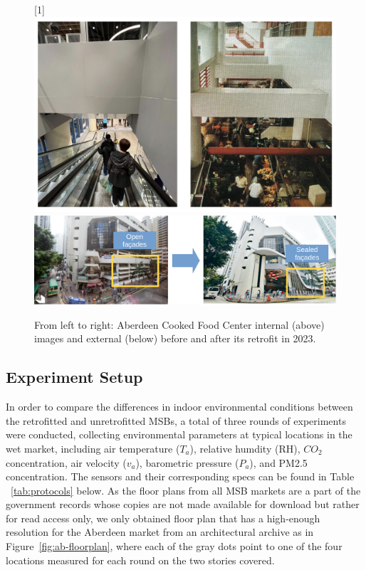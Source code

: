 \documentclass[preprint,12pt]{elsarticle}
\begin{document}
\begin{figure}[h!]
    \centering
    \scalebox{-1}[1]{\includegraphics[width=0.65\linewidth]{img/Aberdeenb4aft.png}}
    \includegraphics[width=0.7\linewidth]{img/open_to_close_facade.png}
    \caption{From left to right: Aberdeen Cooked Food Center internal (above) images and external (below) before and after its retrofit in 2023.}
    \label{fig:transition-ab}
\end{figure}

\subsection{Experiment Setup}%

    In order to compare the differences in indoor environmental conditions between the retrofitted and unretrofitted MSBs, a total of three rounds of experiments were conducted, collecting environmental parameters at typical locations in the wet market, including air temperature ($T_a$), relative humdity (RH), $CO_2$ concentration, air velocity ($v_a$), barometric pressure ($P_a$), and PM2.5 concentration. The sensors and their corresponding specs can be found in Table ~\ref{tab:protocols} below. As the floor plans from all MSB markets are a part of the government records whose copies are not made available for download but rather for read access only, we only obtained floor plan that has a high-enough resolution for the Aberdeen market from an architectural archive as in Figure~\ref{fig:ab-floorplan}, where each of the gray dots point to one of the four locations measured for each round on the two stories covered.
\end{document}
